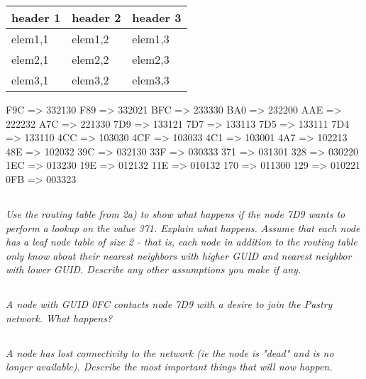 \documentclass{article}
\newcommand{\question}[1]{\subsection{}\textit{#1}\bigskip}
\begin{document}
 \begin{table}[ht!]
    \begin{center}
    \begin{tabular}{| l | l | l |}
    \hline
    header 1        & header 2      & header 3 \\
    \hline
    elem1,1         & elem1,2       & elem1,3 \\
    \hline
    elem2,1         & elem2,2       & elem2,3 \\
    \hline
    elem3,1         & elem3,2       & elem3,3 \\
    \hline
    \end{tabular}
    \end{center}
\end{table}

F9C => 332130
F89 => 332021
BFC => 233330
BA0 => 232200
AAE => 222232
A7C => 221330
7D9 => 133121
7D7 => 133113
7D5 => 133111
7D4 => 133110
4CC => 103030
4CF => 103033
4C1 => 103001
4A7 => 102213
48E => 102032
39C => 032130
33F => 030333
371 => 031301
328 => 030220
1EC => 013230
19E => 012132
11E => 010132
170 => 011300
129 => 010221
0FB => 003323

 \question{Use the routing table from 2a) to show what happens if the node 7D9 wants to perform a lookup on the value 371. Explain what happens. Assume that each node has a leaf node table of size 2 - that is, each node in addition to the routing table only know about their nearest neighbors with higher GUID and nearest neighbor with lower GUID. Describe any other assumptions you make if any.}

 \question{A node with GUID 0FC contacts node 7D9 with a desire to join the Pastry network. What happens?}

 \question{A node has lost connectivity to the network (ie the node is "dead" and is no longer available). Describe the most important things that will now happen.}

 
\end{document}
